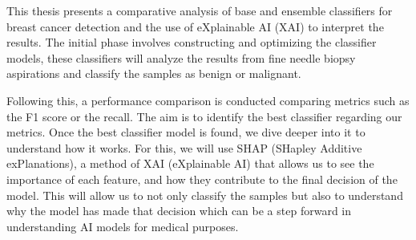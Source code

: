 This 
thesis 
presents a comparative analysis of base and ensemble classifiers for breast cancer detection and the use of 
eXplainable AI (XAI) 
to interpret the results. The initial phase involves constructing and optimizing the classifier models, these classifiers will analyze the results from fine needle biopsy aspirations and classify the samples as benign or malignant.

Following this, a performance comparison is conducted comparing metrics such as the F1 score or the recall. The aim is to identify the best classifier regarding our metrics. Once the best classifier model is found, we dive deeper into it to understand how it works. For this, we will use SHAP (SHapley Additive exPlanations), a method of XAI 
(eXplainable AI) 
that allows us to see the importance of each feature, and how they contribute to the final decision of the model. This will allow us to not only classify the samples but also to understand why the model has made that decision which can be a step forward in understanding AI models for medical purposes.


